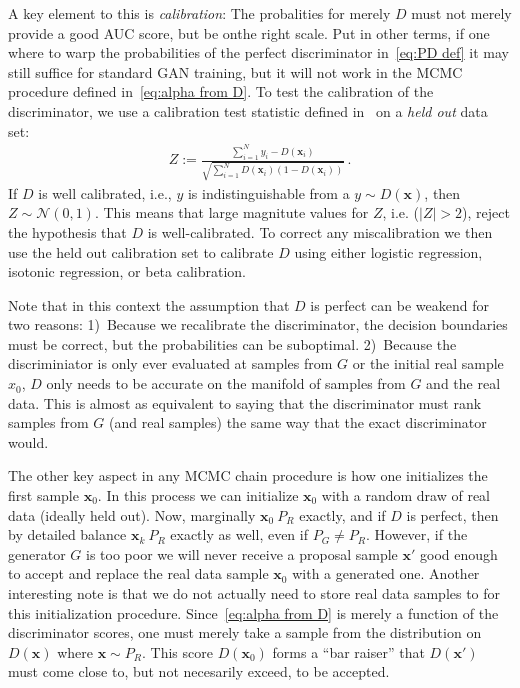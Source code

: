 \documentclass{article}
\renewcommand{\vec}[1]{{\boldsymbol{\mathbf{#1}}}} %
\newcommand{\sample}{\sim}
\newcommand{\norm}{\mathcal{N}}
\begin{document}
A key element to this is \emph{calibration}: The probalities for merely $D$ must not merely provide a good AUC score, but be onthe right scale.
Put in other terms, if one where to warp the probabilities of the perfect discriminator in~\eqref{eq:PD def} it may still suffice for standard GAN training, but it will not work in the MCMC procedure defined in~\eqref{eq:alpha from D}.
To test the calibration of the discriminator, we use a calibration test statistic defined in~\citet{} on a \emph{held out} data set:  %
\begin{align}
  Z := \frac{\sum_{i=1}^N y_i - D(\vec x_i)}{\sqrt{\sum_{i=1}^N D(\vec x_i) (1 - D(\vec x_i))}}\,.
\end{align}
If $D$ is well calibrated, i.e., $y$ is indistinguishable from a $y \sample D(\vec x)$, then $Z \sample \norm(0,1)$.
This means that large magnitute values for $Z$, i.e. ($|Z| > 2$), reject the hypothesis that $D$ is well-calibrated.
To correct any miscalibration we then use the held out calibration set to calibrate $D$ using either logistic regression, isotonic regression, or beta calibration.

Note that in this context the assumption that $D$ is perfect can be weakend for two reasons:
1)~Because we recalibrate the discriminator, the decision boundaries must be correct, but the probabilities can be suboptimal.
2)~Because the discriminiator is only ever evaluated at samples from $G$ or the initial real sample $x_0$, $D$ only needs to be accurate on the manifold of samples from $G$ and the real data.
This is almost as equivalent to saying that the discriminator must rank samples from $G$ (and real samples) the same way that the exact discriminator would.

The other key aspect in any MCMC chain procedure is how one initializes the first sample $\vec x_0$.
In this process we can initialize $\vec x_0$ with a random draw of real data (ideally held out)\@.
Now, marginally $\vec x_0 ~ P_R$ exactly, and if $D$ is perfect, then by detailed balance $\vec x_k ~ P_R$ exactly as well, even if $P_G \neq P_R$.
However, if the generator $G$ is too poor we will never receive a proposal sample $\vec x'$ good enough to accept and replace the real data sample $\vec x_0$ with a generated one.
Another interesting note is that we do not actually need to store real data samples to for this initialization procedure.
Since~\eqref{eq:alpha from D} is merely a function of the discriminator scores, one must merely take a sample from the distribution on $D(\vec x)$ where $\vec x \sample P_R$.
This score $D(\vec x_0)$ forms a ``bar raiser'' that $D(\vec x')$ must come close to, but not necesarily exceed, to be accepted.
\end{document}
